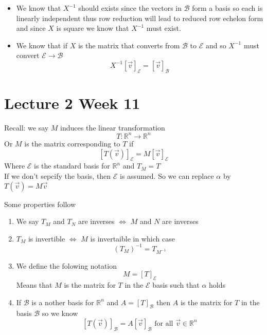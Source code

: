 \documentclass[11pt]{book}
\begin{document}
\begin{itemize}
    \item We know that  $X^{-1} $ should exists since the vectors in $\mathcal{B} $ form a basis so each is linearly independent thus row reduction will lead to reduced row echelon form and since $X$ is square we know that $X^{-1} $ must exist. 
    \item We know that if $X$ is the matrix that converts from $\mathcal{B} $ to $\mathcal{E} $ and so $X^{-1} $ must convert $\mathcal{E} \to \mathcal{B}$  
        \[
        X^{-1} \left[ \vec{v}  \right]_{\mathcal{E}} = \left[ \vec{v}  \right]_{\mathcal{B}} 
        \]

\end{itemize}



\section{Lecture 2 Week 11}%
\label{sec:lecture_2_week_11}

Recall: we say $M$ induces the linear transformation 
\[
T : \mathbb{R} ^{n}  \to \mathbb{R} ^{n}  \tag{$\alpha $}
\]
Or $M$ is the matrix corresponding to $T$ if 
\[
\left[ T\left(\vec{v} \right) \right]_{\mathcal{E}} = M\left[ \vec{v}  \right]_{\mathcal{E}} 
\]
Where $\mathcal{E} $ is the standard basis for $\mathbb{R} ^{n} $ and $T_{M} = T$ \\
If we don't sepcify the basis, then $\mathcal{E} $ is assumed. So we can replace $\alpha $  by $T\left(\vec{v} \right)= M\vec{v} $ 


Some properties follow
\begin{enumerate}
    \item We say $T_{M} $ and $T_{N} $ are inverses $\Leftrightarrow$ $M$ and $N$ are inverses  
    \item $T_{M} $ is invertible $\Leftrightarrow$ $M$ is invertaible in which case
        \[
            \left( T_{M}  \right) ^{-1} = T_{M^{-1} } 
        \]
    \item We define the folowing notation 
        \[
        M= \left[ T \right]_{\mathcal{E}} 
        \]
        Means that $M$ is the matrix for $T$ in the $\mathcal{E} $ basis such that $\alpha $  holds
    \item If $\mathcal{B} $ is a nother basis for $\mathbb{R} ^{n} $ and $A= \left[ T \right]_{\mathcal{B}} $ then $A$ is the matrix for $T$ in the basis $\mathcal{B} $ so we know 
        \begin{equation*}
            \left[ T\left(\vec{v} \right) \right]_{\mathcal{B}} = A\left[ \vec{v}  \right]_{\mathcal{B}} \text{ for all  } \vec{v} \in \mathbb{R} ^{n} 
        \end{equation*}
\end{enumerate}
\end{document}
